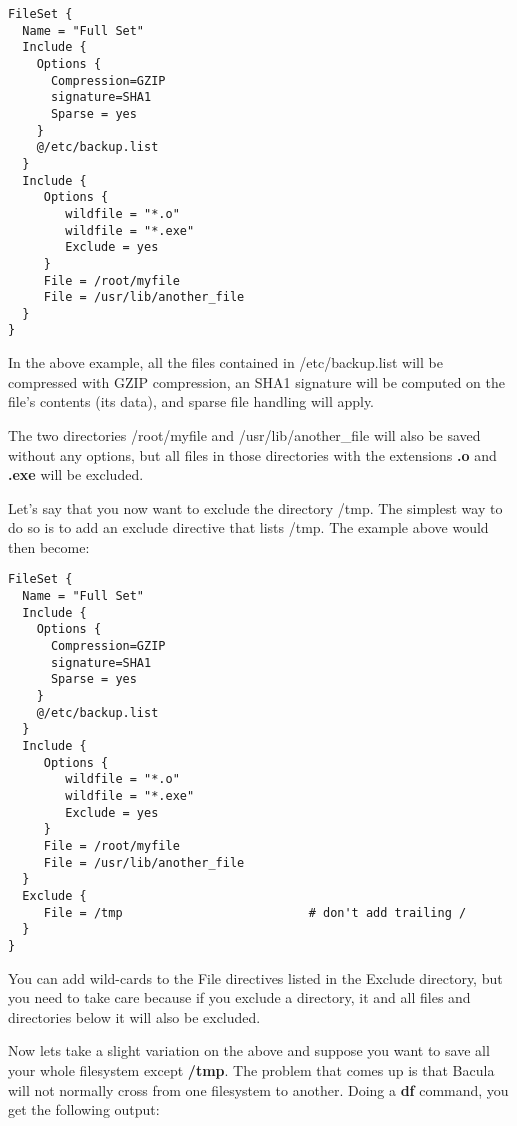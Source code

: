 \footnotesize
\begin{verbatim}
FileSet {
  Name = "Full Set"
  Include {
    Options {
      Compression=GZIP
      signature=SHA1
      Sparse = yes
    }
    @/etc/backup.list
  }
  Include {
     Options {
        wildfile = "*.o"
        wildfile = "*.exe"
        Exclude = yes
     }
     File = /root/myfile
     File = /usr/lib/another_file
  }
}
\end{verbatim}
\normalsize

In the above example, all the files contained in /etc/backup.list will
be compressed with GZIP compression, an SHA1 signature will be computed on the
file's contents (its data), and sparse file handling will apply. 

The two directories /root/myfile and /usr/lib/another\_file will also be saved
without any options, but all files in those directories with the extensions
{\bf .o} and {\bf .exe} will be excluded. 

Let's say that you now want to exclude the directory /tmp. The simplest way
to do so is to add an exclude directive that lists /tmp.  The example
above would then become:

\footnotesize 
\begin{verbatim}
FileSet {
  Name = "Full Set"
  Include {
    Options {
      Compression=GZIP
      signature=SHA1
      Sparse = yes
    }
    @/etc/backup.list
  }
  Include {
     Options {
        wildfile = "*.o"
        wildfile = "*.exe"
        Exclude = yes
     }
     File = /root/myfile
     File = /usr/lib/another_file
  }
  Exclude {
     File = /tmp                          # don't add trailing /
  }
}
\end{verbatim}
\normalsize


You can add wild-cards to the File directives listed in the Exclude
directory, but you need to take care because if you exclude a directory,
it and all files and directories below it will also be excluded.

Now lets take a slight variation on the above and suppose
you want to save all your whole filesystem except {\bf /tmp}. 
The problem that comes up is that Bacula will not normally
cross from one filesystem to another.
Doing a {\bf df} command, you get the following output: 

